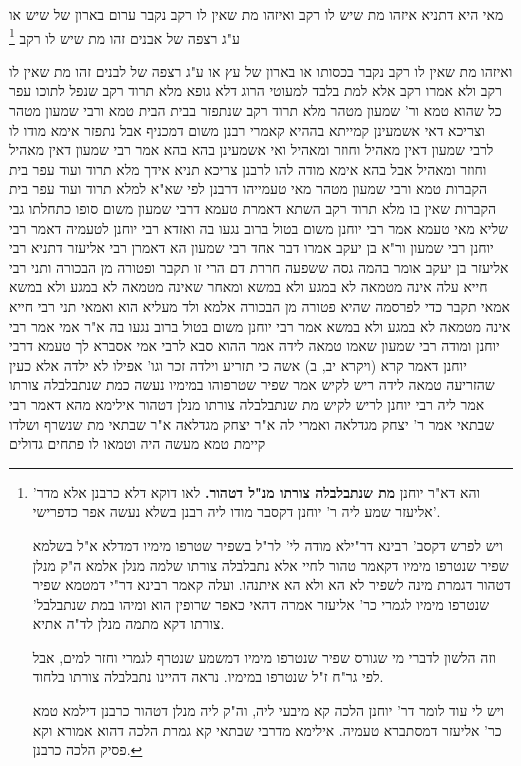 \documentclass[12pt, openany]{book}
\newcommand{\footnotecomment}[1]{\footnote{#1}}
\newcommand{\commenta}[1]{\footnotecomment{#1}}
\begin{document}
{מאי היא  דתניא  איזהו מת שיש לו רקב ואיזהו מת שאין לו רקב  נקבר ערום בארון של שיש או ע"ג רצפה של אבנים זהו מת שיש לו רקב
\commenta{ והא דא"ר יוחנן \textbf{מת שנתבלבלה צורתו מנ"ל דטהור.}  לאו דוקא דלא כרבנן אלא מדר' אליעזר שמע ליה ר' יוחנן דקסבר מודו ליה רבנן בשלא נעשה אפר כדפרישי'.\par  ויש לפרש דקסב' רבינא דר"ילא מודה לי' לר"ל בשפיר שטרפו מימיו דמדלא א"ל בשלמא שפיר שנטרפו מימיו דקאמר טהור לחיי אלא נתבלבלה צורתו שלמה מנלן אלמא ה"ק מנלן דטהור דגמרת מינה לשפיר לא הא ולא הא איתנהו. ועלה קאמר רבינא דר"י דמטמא שפיר שנטרפו מימיו לגמרי כר' אליעזר אמרה דהאי כאפר שרופין הוא ומיהו במת שנתבלבל' צורתו דקא מתמה מנלן לד"ה אתיא.\par וזה הלשון לדברי מי שגורס שפיר שנטרפו מימיו דמשמע שנטרף לגמרי וחזר למים, אבל לפי גר"ח ז"ל שנטרפו במימיו. נראה דהיינו נתבלבלה צורתו בלחוד.\par ויש לי עוד לומר דר' יוחנן הלכה קא מיבעי ליה, וה"ק ליה מנלן דטהור כרבנן דילמא טמא כר' אליעזר דמסתברא טעמיה. אילימא מדרבי שבתאי קא גמרת הלכה דהוא אמורא וקא פסיק הלכה כרבנן. }

ואיזהו מת שאין לו רקב נקבר בכסותו או בארון של עץ או ע"ג רצפה של לבנים זהו מת שאין לו רקב  ולא אמרו רקב אלא למת בלבד למעוטי הרוג דלא 
גופא  מלא תרוד רקב שנפל לתוכו עפר כל שהוא טמא ור' שמעון מטהר  מלא תרוד רקב שנתפזר בבית הבית טמא ורבי שמעון מטהר 
וצריכא  דאי אשמעינן קמייתא בההיא קאמרי רבנן משום דמכניף אבל נתפזר אימא מודו לו לרבי שמעון דאין מאהיל וחוזר ומאהיל 
ואי אשמעינן בהא בהא אמר רבי שמעון דאין מאהיל וחוזר ומאהיל אבל בהא אימא מודה להו לרבנן צריכא 
תניא אידך  מלא תרוד ועוד עפר בית הקברות טמא  ורבי שמעון מטהר  מאי טעמייהו דרבנן  לפי שא"א למלא תרוד ועוד עפר בית הקברות שאין בו מלא תרוד רקב 
השתא דאמרת טעמא דרבי שמעון משום סופו כתחלתו גבי שליא מאי טעמא  אמר רבי יוחנן  משום בטול ברוב נגעו בה 
ואזדא רבי יוחנן לטעמיה דאמר רבי יוחנן  רבי שמעון ור"א בן יעקב אמרו דבר אחד  רבי שמעון הא דאמרן  רבי אליעזר דתניא רבי אליעזר בן יעקב אומר  בהמה גסה ששפעה חררת דם הרי זו תקבר ופטורה מן הבכורה 
ותני רבי חייא עלה  אינה מטמאה לא במגע ולא במשא  ומאחר שאינה מטמאה לא במגע ולא במשא אמאי תקבר  כדי לפרסמה שהיא פטורה מן הבכורה 
אלמא ולד מעליא הוא ואמאי תני רבי חייא אינה מטמאה לא במגע ולא במשא  אמר רבי יוחנן  משום בטול ברוב נגעו בה 
א"ר אמי אמר רבי יוחנן  ומודה רבי שמעון שאמו טמאה לידה 
אמר ההוא סבא לרבי אמי  אסברא לך טעמא דרבי יוחנן דאמר קרא (ויקרא יב, ב) אשה כי תזריע וילדה זכר וגו' אפילו לא ילדה אלא כעין שהזריעה טמאה לידה 
ריש לקיש אמר  שפיר שטרפוהו במימיו נעשה כמת שנתבלבלה צורתו 
אמר ליה רבי יוחנן לריש לקיש  מת שנתבלבלה צורתו מנלן דטהור  אילימא מהא דאמר רבי שבתאי אמר ר' יצחק מגדלאה ואמרי לה א"ר יצחק מגדלאה א"ר שבתאי  מת שנשרף ושלדו קיימת טמא מעשה היה וטמאו לו פתחים גדולים}
\end{document}
